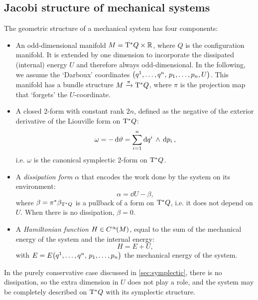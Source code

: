 \subsection{Jacobi structure of mechanical systems}
The geometric structure of a mechanical system has four components:
\begin{itemize}
    \item An odd-dimensional manifold \(M = \mathrm{T}^*Q\times \mathbb{R}\), where \(Q\) is the configuration manifold. It is extended by one dimension to incorporate the dissipated (internal) energy \(U\) and therefore always odd-dimensional. In the following, we assume the `Darboux' coordinates \(\qty(q^1, \ldots, q^n,\, p_1, \ldots, p_n, U)\).
    This manifold has a bundle structure \(M\xrightarrow[]{\pi}\mathrm{T}^*Q\), where \(\pi\) is the projection map that `forgets' the \(U\)-coordinate.
    \item A closed 2-form with constant rank \(2n\), defined as the negative of the exterior derivative of the Liouville form on \(\mathrm{T}^*Q\):
        \begin{equation}
     \omega = -\dd{\vartheta} = \sum^n_{i=1}  \dd{q^i}\,\wedge\,\dd{p_i} ,
\end{equation}
        i.e. \(\omega\) is the canonical symplectic 2-form on \(\mathrm{T}^*Q\).
    \item A \emph{dissipation form} \(\alpha\) that encodes the work done by the system on its environment:
        \begin{equation}
     \alpha = \dd{U} - \beta,
\end{equation}
        where \(\beta = \pi^*\beta_{\mathrm{T}^*Q}\) is a pullback of a form on \(\mathrm{T}^*Q\), i.e. it does not depend on \(U\). When there is no dissipation, \(\beta = 0\).
    \item A \emph{Hamiltonian function} \(H \in C^\infty\!\qty(M)\), equal to the sum of the mechanical energy of the system and the internal energy:
        \begin{equation}
     H = E + U,
\end{equation}
        with \(E = E\qty(q^1, \ldots, q^n,\, p_1, \ldots, p_n)\) the mechanical energy of the system.
\end{itemize}

In the purely conservative case discussed in \cref{sec:symplectic}, there is no dissipation, so the extra dimension in \(U\) does not play a role, and the system may be completely described on \(\mathrm{T}^*Q\) with its symplectic structure. 

